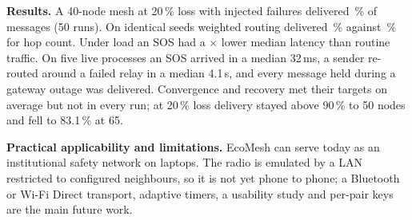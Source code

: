 \textbf{Results.} A 40-node mesh at 20\,\% loss with injected failures delivered \CollDel\,\% of messages (50 runs). On identical seeds weighted routing delivered \HopW\,\% against \HopH\,\% for hop count. Under load an SOS had a \SosAdv$\times$ lower median latency than routine traffic. On five live processes an SOS arrived in a median 32\,ms, a sender re-routed around a failed relay in a median 4.1\,s, and every message held during a gateway outage was delivered. Convergence and recovery met their targets on average but not in every run; at 20\,\% loss delivery stayed above 90\,\% to 50 nodes and fell to 83.1\,\% at 65.

\textbf{Practical applicability and limitations.} EcoMesh can serve today as an institutional safety network on laptops. The radio is emulated by a LAN restricted to configured neighbours, so it is not yet phone to phone; a Bluetooth or Wi-Fi Direct transport, adaptive timers, a usability study and per-pair keys are the main future work.
